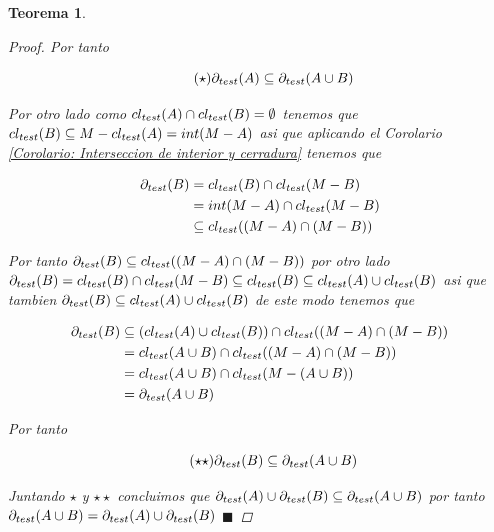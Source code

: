 \documentclass[oneside]{book} %
\theoremstyle{Teorema}
\newtheorem{Teorema}[Definicion]{Teorema}
\theoremstyle{Ejemplos}
\theoremstyle{[Obs]}
\def \test {test}
\newcommand{\cerradura}[2][\test]{\ifx \test #1 {\overline{#2}} \else {cl_{#1}(#2)} \fi} %
\newcommand{\frontera}[2][\test]{\ifx \test #1 {\partial(#2)} \else {\partial_{#1}(#2)} \fi} %
\renewcommand{\{}{\left\lbrace} %
\renewcommand{\}}{\right\rbrace} %
\renewcommand{\u}{\cup} %
\newcommand{\n}{\cap} %
\renewcommand{\sc}{\subseteq} %
\renewcommand{\qed}{$\blacksquare$} %
\begin{document}
\begin{Teorema}
\begin{proof}
					Por tanto 
					
					\begin{equation*}\tag{$\star$}
						\frontera{A} \sc \frontera{A \u B}
					\end{equation*}
					
					Por otro lado como $\cerradura{A} \n \cerradura{B} = \emptyset$ tenemos que $\cerradura{B} \sc M - \cerradura{A} = int(M - A)$ asi que aplicando el Corolario \ref{Corolario: Interseccion de interior y cerradura} tenemos que

					\begin{align*}
						\frontera{B} &= \cerradura{B} \n \cerradura{M - B} \\ 
						&= int(M - A) \n \cerradura{M - B} \\ 
						&\sc \cerradura{(M - A) \n (M - B)}
					\end{align*}

					Por tanto $\frontera{B} \sc \cerradura{(M - A) \n (M - B)}$ por otro lado $\frontera{B} = \cerradura{B} \n \cerradura{M - B} \sc \cerradura{B} \sc \cerradura{A} \u \cerradura{B}$ asi que tambien $\frontera{B} \sc \cerradura{A} \u \cerradura{B}$ de este modo tenemos que 

					\begin{align*}
						\frontera{B} &\sc (\cerradura{A} \u \cerradura{B}) \n \cerradura{(M - A) \n (M - B)} \\ 
						&= \cerradura{A \u B} \n \cerradura{(M - A) \n (M - B)} \\ 
						&= \cerradura{A \u B} \n \cerradura{M - (A \u B)} \\ 
						&= \frontera{A \u B} 
					\end{align*}

					Por tanto 
					
					\begin{equation*}\tag{$\star\star$}
						\frontera{B} \sc \frontera{A \u B}
					\end{equation*}

					Juntando $\star$ y $\star\star$ concluimos que $\frontera{A} \u \frontera{B} \sc \frontera{A \u B}$ por tanto $\frontera{A \u B} = \frontera{A} \u \frontera{B}$ \qed

				\end{proof}

			\end{Teorema}
\end{document}
